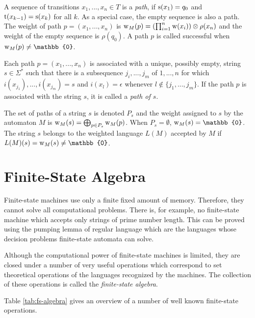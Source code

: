 A sequence of transitions $x_1, ..., x_n \in T$ is a {\it path}, if
 $\mbox{${\rm s}$}(x_1) = q_0$ and $\mbox{${\rm t}$}(x_{k-1}) = \mbox{${\rm s}$}(x_k)$ for all $k$. As a special case, the empty
sequence is also a path. The weight of path $p = (x_1, ..., x_n)$ is $\mbox{${\rm w}$}_M(p) = ( \prod_{i = 1}^n \mbox{${\rm w}$}(x_i) ) \otimes \rho(x_n)$ and the weight of the empty sequence is $\rho(q_0)$. A path $p$ is called successful when $\w_M(p) \ne \mathbb{0}$.

Each path $p = (x_1, ..., x_n)$ is associated with a unique, possibly
empty, string $s \in \Sigma^*$ such that there is a subsequence $j_i,
..., j_m$ of $1, ..., n$ for which $i(x_{j_1}), ..., i(x_{j_m}) = s$
and $i(x_{l}) = \epsilon$ whenever $l \notin \{j_1, ..., j_m\}$. If
the path $p$ is associated with the string $s$, it is called a {\it
  path of $s$}.

The set of paths of a string $s$ is denoted $P_s$ and the weight
assigned to $s$ by the automaton $M$ is $\mbox{${\rm w}$}_M(s) = \bigoplus_{p \in
  P_s} \mbox{${\rm w}$}_M(p)$. When $P_s = \emptyset$, $\w_M(s) = \mathbb{0}$. The
string $s$ belongs to the weighted language $L(M)$ accepted by $M$ if
$L(M)(s) = \w_M(s) \ne \mathbb{0}$.

\section{Finite-State Algebra}

Finite-state machines use only a finite fixed amount of
memory. Therefore, they cannot solve all computational problems. There
is, for example, no finite-state machine which accepts only strings of
prime number length. This can be proved using the pumping lemma of
regular language \citep{Sipser1996} which are the languages whose
decision problems finite-state automata can solve.

Although the computational power of finite-state machines is limited,
they are closed under a number of very useful operations which
correspond to set theoretical operations of the languages recognized
by the machines. The collection of these operations is called the {\it
  finite-state algebra}.

Table \ref{tab:fs-algebra} gives an overview of a number of well known
finite-state operations.

